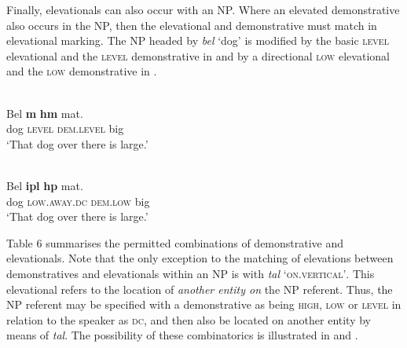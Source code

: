 Finally, elevationals can also occur with an NP. Where an elevated demonstrative also occurs in the NP, then the elevational and demonstrative must match in elevational marking. The NP headed by \textit{bel} `dog' is modified by the basic \textsc{level} elevational and the \textsc{level} demonstrative in  and by a directional \textsc{low} elevational and the \textsc{low} demonstrative in .  



\ea%
\label{ex:7:26}
 \\
\gll Bel  \textbf{m{\textopeno}{\ng}}  \textbf{h{\textepsilon}m{\textopeno}} mat{\textepsilon}.  \\
  dog  \textsc{level} \textsc{dem.level} big      \\
\glt   `That dog over there is large.'
\z

 
 





\ea%
\label{ex:7:27}
 \\
\gll   Bel  \textbf{ipl{\textepsilon}} \textbf{h{\textepsilon}p{\textopeno}} mat{\textepsilon}. \\
    dog  \textsc{low.away.dc} \textsc{dem.low} big    \\
\glt   `That dog over there is large.'
\z



   



{Table 6 summarises the permitted combinations of demonstrative and elevationals. Note that the only exception to the matching of elevations between demonstratives and elevationals within an NP is with} \textit{tal}\textit{{\textepsilon}} `\textsc{on.vertical'}. This elevational refers to the location of \textit{another entity on} the NP referent. Thus, the NP referent may be specified with a demonstrative as being \textsc{high}, \textsc{low} or \textsc{level} in relation to the speaker as \textsc{dc}, and then also be located on another entity by means of \textit{tal}\textit{{\textepsilon}}. The possibility of these combinatorics is illustrated in  and .

